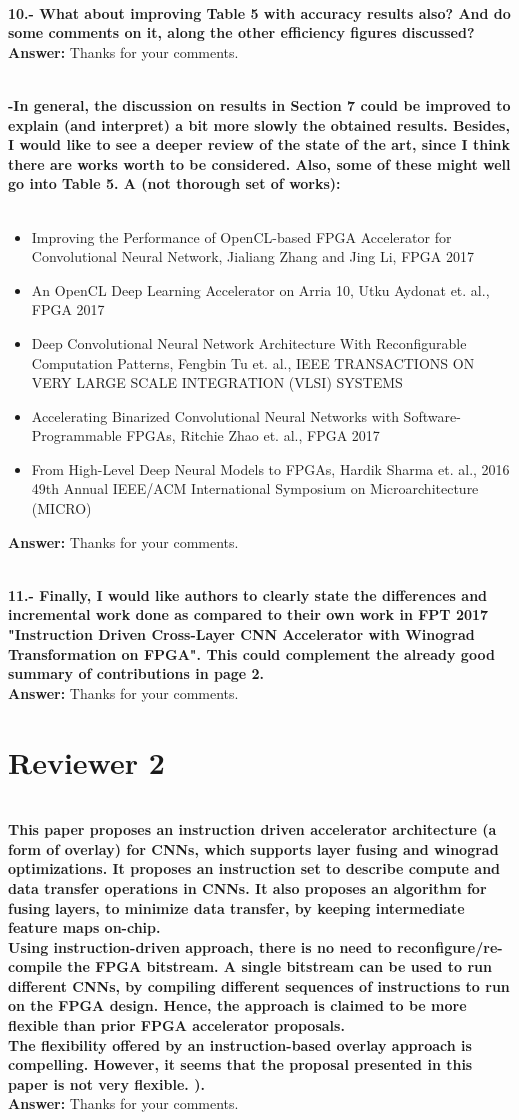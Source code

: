 \documentclass[12pt]{paper}
\newcommand{\rev}[1]{{{\color[rgb]{0,0,1}{#1}}}}
\newcommand{\reviewer}[1]{\section*{Reviewer #1}}
\newcommand{\answer}[1]{\noindent\textbf{Answer:} #1}
\newcommand{\comment}[1]{\noindent\textbf{\\ #1}\\}
\begin{document}
\comment{10.- What about improving Table 5 with accuracy results also? And do some comments on it, along the other efficiency figures discussed? }
\answer{Thanks for your comments.}
\rev{We have corrected this error.}

\comment{-In general, the discussion on results in Section 7 could be improved to explain (and interpret) a bit more slowly the obtained results. Besides, I would like to see a deeper review of the state of the art, since I think there are works worth to be considered. Also, some of these might well go into Table 5. A (not thorough set of works):
} \\
\begin{itemize}
\item Improving the Performance of OpenCL-based FPGA Accelerator for Convolutional Neural Network, Jialiang Zhang and Jing Li, FPGA 2017
\item An OpenCL Deep Learning Accelerator on Arria 10, Utku Aydonat et. al., FPGA 2017
\item Deep Convolutional Neural Network Architecture With Reconfigurable Computation Patterns, Fengbin Tu et. al., IEEE TRANSACTIONS ON VERY LARGE SCALE INTEGRATION (VLSI) SYSTEMS
\item Accelerating Binarized Convolutional Neural Networks with Software-Programmable FPGAs, Ritchie Zhao et. al., FPGA 2017
\item From High-Level Deep Neural Models to FPGAs, Hardik Sharma et. al., 2016 49th Annual IEEE/ACM International Symposium on Microarchitecture (MICRO) 
\end{itemize}

\answer{Thanks for your comments.}
\rev{We have corrected this error.}

\comment{11.- Finally, I would like authors to clearly state the differences and incremental work done as compared to their own work in FPT 2017 "Instruction Driven Cross-Layer CNN Accelerator with Winograd Transformation on FPGA". This could complement the already good summary of contributions in page 2.}
\answer{Thanks for your comments.}
\rev{We have corrected this error.}

\reviewer{2}

\comment{This paper proposes an instruction driven accelerator architecture (a form of overlay) for CNNs, which supports layer fusing and winograd optimizations. It proposes an instruction set to describe compute and data transfer operations in CNNs. It also proposes an algorithm for fusing layers, to minimize data transfer, by keeping intermediate feature maps on-chip.\\ 
Using instruction-driven approach, there is no need to reconfigure/re-compile the FPGA bitstream. A single bitstream can be used to run different CNNs, by compiling different sequences of instructions to run on the FPGA design. Hence, the approach is claimed to be more flexible than prior FPGA accelerator proposals. \\
The flexibility offered by an instruction-based overlay approach is compelling. However, it seems that the proposal presented in this paper is not very flexible. ). 
}
\answer{Thanks for your comments.}
\rev{We have corrected this error.}
\end{document}
